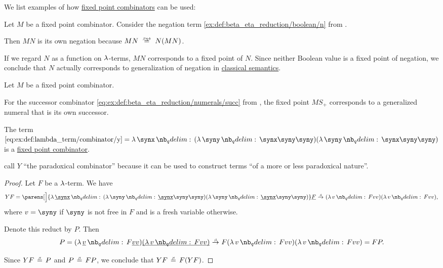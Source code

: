 \begin{example}\label{ex:def:function_fixed_point_combinator}
  We list examples of how \hyperref[def:function_fixed_point_combinator]{fixed point combinators} can be used:
  \begin{thmenum}
     Let \( M \) be a fixed point combinator. Consider the negation term \ref{ex:def:beta_eta_reduction/boolean/n} from .

    Then \( MN \) is its own negation because \( MN \equivrel{\beta\eta\delta} N(MN) \).

    If we regard \( N \) as a function on \( \mathrm{\lambda} \)-terms, \( MN \) corresponds to a fixed point of \( N \). Since neither Boolean value is a fixed point of negation, we conclude that \( N \) actually corresponds to generalization of negation in \hyperref[def:propositional_semantics/classical]{classical semantics}.

     Let \( M \) be a fixed point combinator.

    For the successor combinator \ref{eq:ex:def:beta_eta_reduction/numerals/succ} from , the fixed point \( MS_+ \) corresponds to a generalized numeral that is its own successor.
  \end{thmenum}
\end{example}

\begin{proposition}\label{thm:y_is_a_fixed_point_combinator}
  The term \( \ref{eq:ex:def:lambda_term/combinator/y} = \qabs \synx (\qabs \syny \synx \syny \syny) (\qabs \syny \synx \syny \syny) \) is a \hyperref[def:function_fixed_point_combinator]{fixed point combinator}.
\end{proposition}
\begin{comments}
  \item {} call \( Y \) \enquote{the paradoxical combinator} because it can be used to construct terms \enquote{of a more or less paradoxical nature}.
\end{comments}
\begin{proof}
  Let \( F \) be a \( \mathrm{\lambda} \)-term. We have
  \begin{equation*}
    YF
    =
    \parens[\Big]{ \qabs {\hi{\synx}} (\qabs \syny \hi{\synx} \syny \syny) (\qabs \syny \hi{\synx} \syny \syny) } \hi{F}
    \bred
    (\qabs v F v v) (\qabs v F v v),
  \end{equation*}
  where \( v = \syny \) if \( \syny \) is not free in \( F \) and is a fresh variable otherwise.

  Denote this reduct by \( P \). Then
  \begin{equation*}
    P =
    (\qabs {\hi{v}} F \hi{v} \hi{v}) \hi{(\qabs v F v v)}
    \bred
    F (\qabs v F v v) (\qabs v F v v)
    =
    FP.
  \end{equation*}

  Since \( YF \equivrel\beta P \) and \( P \equivrel\beta FP \), we conclude that \( YF \equivrel\beta F(YF) \).
\end{proof}

